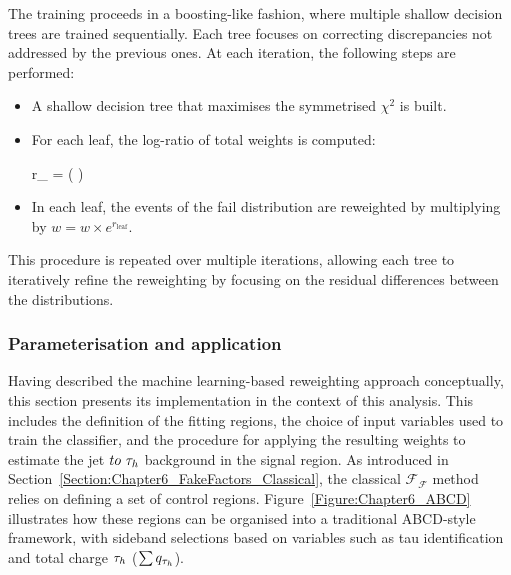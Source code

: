 The training proceeds in a boosting-like fashion, where multiple shallow decision trees are trained sequentially. Each tree focuses on correcting discrepancies not addressed by the previous ones. At each iteration, the following steps are performed:

\begin{itemize}
    \item A shallow decision tree that maximises the symmetrised $\chi^2$ is built.
    \item For each leaf, the log-ratio of total weights is computed:
    \begin{equation_pad}
        r_ = \log \left(  \right)
    \end{equation_pad}
    \item In each leaf, the events of the fail distribution are reweighted by multiplying by $w = w \times e^{r{_\text{leaf}}}$.
\end{itemize}

This procedure is repeated over multiple iterations, allowing each tree to iteratively refine the reweighting by focusing on the residual differences between the distributions.

\subsubsection{Parameterisation and application}

Having described the machine learning-based reweighting approach conceptually, this section presents its implementation in the context of this analysis. This includes the definition of the fitting regions, the choice of input variables used to train the classifier, and the procedure for applying the resulting weights to estimate the jet $to~\tau_h$ background in the signal region. As introduced in Section~\ref{Section:Chapter6_FakeFactors_Classical}, the classical $\mathcal{F_F}$ method relies on defining a set of control regions. Figure~\ref{Figure:Chapter6_ABCD} illustrates how these regions can be organised into a traditional ABCD-style framework, with sideband selections based on variables such as tau identification and total charge $\tau_h$ ($\sum q_{\tau_h}$). 

